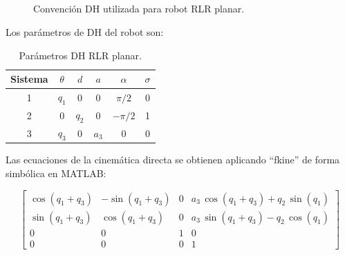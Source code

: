 \documentclass[a4paper,12pt]{article}
\begin{document}
\subsection{}
\begin{figure}[H]
    \centering
    \begin{adjustbox}{scale = 0.55, max width=\columnwidth}
    \end{adjustbox}
    \caption{Convención DH utilizada para robot RLR planar.}
\end{figure}

Los parámetros de DH del robot son:
\begin{table}[H]
    \centering
    \begin{tabular}{|c|c|c|c|c|c|}
    \hline
    Sistema & $\theta$          & $d$         & $a$         & $\alpha$     & $\sigma$ \\ \hline
    1       & $q_1$             & 0           & $0$         & $\pi/2$   & 0        \\ \hline
    2       & $0$               & $q_2$       & $0$         & $-\pi/2$  & 1        \\ \hline
    3       & $q_3$             & 0           & $a_3$  & $0$          & 0        \\ \hline
    \end{tabular}
    \caption{Parámetros DH RLR planar.}
\end{table}

Las ecuaciones de la cinemática directa se obtienen aplicando ``fkine'' de forma simbólica
en MATLAB:

\begin{equation*}
    \left[\begin{array}{cccc}
        \cos\left(q_{1}+q_{3}\right) & -\sin\left(q_{1}+q_{3}\right) & 0 & a_{3}\,\cos\left(q_{1}+q_{3}\right)+q_{2}\,\sin\left(q_{1}\right)\\
        \sin\left(q_{1}+q_{3}\right) & \cos\left(q_{1}+q_{3}\right) & 0 & a_{3}\,\sin\left(q_{1}+q_{3}\right)-q_{2}\,\cos\left(q_{1}\right)\\
        0 & 0 & 1 & 0\\
        0 & 0 & 0 & 1
    \end{array}
    \right]
\end{equation*}
\end{document}
